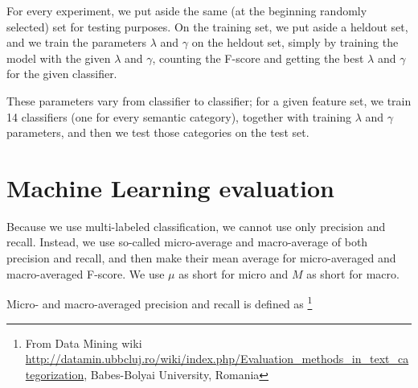 \documentclass[letterpaper]{article}
\newcommand{\todofn}[1] {
 \footnote{\textbf{TODO : #1}}}
\begin{document}
For every experiment, we put aside the same (at the beginning randomly selected) set for testing purposes. 
On the training set, we put aside a heldout set, and we train the parameters $\lambda$ and $\gamma$ on the heldout set, simply by training the model with the given $\lambda$ and $\gamma$, counting the F-score and getting the best $\lambda$ and $\gamma$ for the given classifier.

These parameters vary from classifier to classifier; for a given feature set, we train 14 classifiers (one for every semantic category), together with training $\lambda$ and $\gamma$ parameters, and then we test those categories on the test set.

%
%
%
%
%

\section{Machine Learning evaluation}
Because we use multi-labeled classification, we cannot use only precision and recall. Instead, we use so-called micro-average and macro-average of both precision and recall, and then make their mean average for micro-averaged and macro-averaged F-score. We use $\mu$ as short for micro and $M$ as short for macro.

Micro- and macro-averaged precision and recall is defined as \footnote{From Data Mining wiki  \url{http://datamin.ubbcluj.ro/wiki/index.php/Evaluation_methods_in_text_categorization}, Babes-Bolyai University, Romania} 
\end{document}
